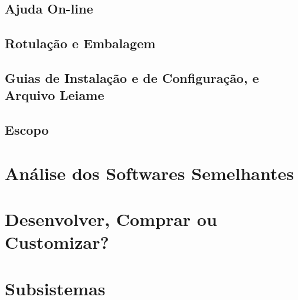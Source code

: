 \subsection{Ajuda On-line}

\subsection{Rotulação e Embalagem}

\subsection{Guias de Instalação e de Configuração, e Arquivo Leiame}

\subsection{Escopo}

\section{Análise dos Softwares Semelhantes}

\section{Desenvolver, Comprar ou Customizar?}

\section{Subsistemas}
  
